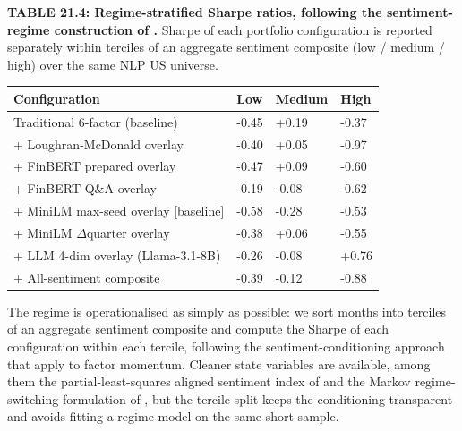 \textbf{TABLE 21.4: Regime-stratified Sharpe ratios, following the sentiment-regime construction of \cite{grobys2021factor}.} Sharpe of each portfolio configuration is reported separately within terciles of an aggregate sentiment composite (low / medium / high) over the same NLP US universe.

\bigskip\noindent
\begin{tabular}{p{}p{}p{}p{}}
\toprule
Configuration & Low & Medium & High \\
\hline
Traditional 6-factor (baseline) & -0.45 & +0.19 & -0.37 \\
+ Loughran-McDonald overlay & -0.40 & +0.05 & -0.97 \\
+ FinBERT prepared overlay & -0.47 & +0.09 & -0.60 \\
+ FinBERT Q\&A overlay & -0.19 & -0.08 & -0.62 \\
+ MiniLM max-seed overlay [baseline] & -0.58 & -0.28 & -0.53 \\
+ MiniLM $\Delta$quarter overlay & -0.38 & +0.06 & -0.55 \\
+ LLM 4-dim overlay (Llama-3.1-8B) & -0.26 & -0.08 & +0.76 \\
+ All-sentiment composite & -0.39 & -0.12 & -0.88 \\
\bottomrule
\end{tabular}

\bigskip

The regime is operationalised as simply as possible: we sort months into terciles of an aggregate sentiment composite and compute the Sharpe of each configuration within each tercile, following the sentiment-conditioning approach that \cite{grobys2021factor} apply to factor momentum. Cleaner state variables are available, among them the partial-least-squares aligned sentiment index of \cite{huang2015investor} and the Markov regime-switching formulation of \cite{chung2012when}, but the tercile split keeps the conditioning transparent and avoids fitting a regime model on the same short sample.

